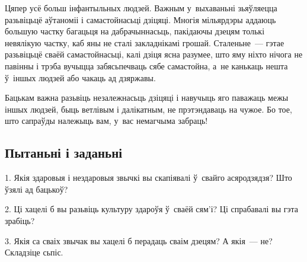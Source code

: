Цяпер усё больш інфантыльных людзей. Важным у~выхаваньні зьяўляецца разьвіцьцё аўтаноміі і самастойнасьці дзіцяці. Многія мільярдэры аддаюць большую частку багацьця на дабрачыннасьць, пакідаючы дзецям толькі невялікую частку, каб яны не сталі закладнікамі грошай. Сталеньне~--- гэтае разьвіцьцё сваёй самастойнасьці, калі дзіця ясна разумее, што яму ніхто нічога не павінны і трэба вучыцца забясьпечваць сябе самастойна, а~не канькаць нешта ў~іншых людзей або чакаць ад дзяржавы.

Бацькам важна разьвіць незалежнасьць дзіцяці і навучыць яго паважаць межы іншых людзей, быць ветлівым і далікатным, не прэтэндаваць на чужое. Бо тое, што сапраўды належыць вам, у~вас немагчыма забраць!

\subsection*{Пытаньні і заданьні}

1. Якія здаровыя і нездаровыя звычкі вы скапіявалі ў~свайго асяродзядзя? Што ўзялі ад бацькоў?

2. Ці хацелі б вы разьвіць культуру здароўя ў~сваёй сям'і? Ці спрабавалі вы гэта зрабіць?

3. Якія са сваіх звычак вы хацелі б перадаць сваім дзецям? А якія~--- не? Складзіце сьпіс.


